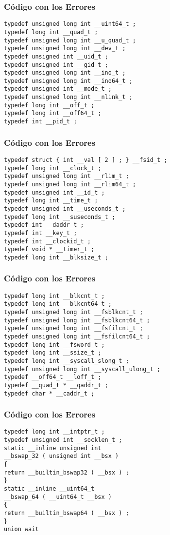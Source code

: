 \documentclass{beamer}
\begin{document}
\begin{frame}[fragile]
\frametitle{C\'odigo con los Errores}
\begin{lstlisting}[style=CStyle]
typedef unsigned long int __uint64_t ; 
typedef long int __quad_t ; 
typedef unsigned long int __u_quad_t ; 
typedef unsigned long int __dev_t ; 
typedef unsigned int __uid_t ; 
typedef unsigned int __gid_t ; 
typedef unsigned long int __ino_t ; 
typedef unsigned long int __ino64_t ; 
typedef unsigned int __mode_t ; 
typedef unsigned long int __nlink_t ; 
typedef long int __off_t ; 
typedef long int __off64_t ; 
typedef int __pid_t ; 
\end{lstlisting}
\end{frame}
\begin{frame}[fragile]
\frametitle{C\'odigo con los Errores}
\begin{lstlisting}[style=CStyle]
typedef struct { int __val [ 2 ] ; } __fsid_t ; 
typedef long int __clock_t ; 
typedef unsigned long int __rlim_t ; 
typedef unsigned long int __rlim64_t ; 
typedef unsigned int __id_t ; 
typedef long int __time_t ; 
typedef unsigned int __useconds_t ; 
typedef long int __suseconds_t ; 
typedef int __daddr_t ; 
typedef int __key_t ; 
typedef int __clockid_t ; 
typedef void * __timer_t ; 
typedef long int __blksize_t ; 
\end{lstlisting}
\end{frame}
\begin{frame}[fragile]
\frametitle{C\'odigo con los Errores}
\begin{lstlisting}[style=CStyle]
typedef long int __blkcnt_t ; 
typedef long int __blkcnt64_t ; 
typedef unsigned long int __fsblkcnt_t ; 
typedef unsigned long int __fsblkcnt64_t ; 
typedef unsigned long int __fsfilcnt_t ; 
typedef unsigned long int __fsfilcnt64_t ; 
typedef long int __fsword_t ; 
typedef long int __ssize_t ; 
typedef long int __syscall_slong_t ; 
typedef unsigned long int __syscall_ulong_t ; 
typedef __off64_t __loff_t ; 
typedef __quad_t * __qaddr_t ; 
typedef char * __caddr_t ; 
\end{lstlisting}
\end{frame}
\begin{frame}[fragile]
\frametitle{C\'odigo con los Errores}
\begin{lstlisting}[style=CStyle]
typedef long int __intptr_t ; 
typedef unsigned int __socklen_t ; 
static __inline unsigned int 
__bswap_32 ( unsigned int __bsx ) 
{ 
return __builtin_bswap32 ( __bsx ) ; 
} 
static __inline __uint64_t 
__bswap_64 ( __uint64_t __bsx ) 
{ 
return __builtin_bswap64 ( __bsx ) ; 
} 
union wait 
\end{lstlisting}
\end{frame}
\end{document}

